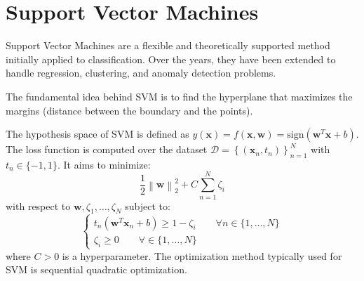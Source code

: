 \section{Support Vector Machines}

Support Vector Machines are a flexible and theoretically supported method initially applied to classification. 
Over the years, they have been extended to handle regression, clustering, and anomaly detection problems.

The fundamental idea behind SVM is to find the hyperplane that maximizes the margins (distance between the boundary and the points).

The hypothesis space of SVM is defined as $y(\mathbf{x})=f(\mathbf{x},\mathbf{w})=\text{sign}(\mathbf{w}^T\mathbf{x}+b)$. 
The loss function is computed over the dataset $\mathcal{D}=\left\{(\mathbf{x}_n,t_n)\right\}_{n=1}^{N}$ with $t_n\in\{-1,1\}$.
It aims to minimize:
\[\dfrac{1}{2}\left\lVert \mathbf{w} \right\rVert _2^2+C\sum_{n=1}^{N}\zeta_i \]
with respect to $\mathbf{w},\zeta_1,\ldots,\zeta_N$ subject to:
\[\begin{cases}
    t_n(\mathbf{w}^T\mathbf{x}_n+b)\geq 1-\zeta_i \qquad\forall n \in \{1,\ldots,N\} \\
    \zeta_i\geq 0\qquad\forall\in\{1,\ldots,N\}
\end{cases}\]
where $C > 0$ is a hyperparameter. 
The optimization method typically used for SVM is sequential quadratic optimization.


